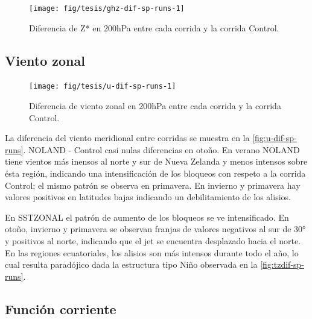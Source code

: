 \documentclass[spanish,a4paper,12pt,oneside]{book}
\begin{document}
\begin{landscape}\begin{figure}

{\centering \texttt{[image: fig/tesis/ghz-dif-sp-runs-1]} 

}

\caption{Diferencia de Z* en 200hPa entre cada corrida y la corrida Control.}\label{fig:ghz-dif-sp-runs}
\end{figure}
\end{landscape}

\subsection{Viento zonal}\label{viento-zonal-2}

\begin{landscape}\begin{figure}

{\centering \texttt{[image: fig/tesis/u-dif-sp-runs-1]} 

}

\caption{Diferencia de viento zonal en 200hPa entre cada corrida y la corrida Control.}\label{fig:u-dif-sp-runs}
\end{figure}
\end{landscape}

La diferencia del viento meridional entre corridas se muestra en la
\autoref{fig:u-dif-sp-runs}. NOLAND - Control casi nulas diferencias en
otoño. En verano NOLAND tiene vientos más inensos al norte y sur de
Nueva Zelanda y menos intensos sobre ésta región, indicando una
intensificación de los bloqueos con respeto a la corrida Control; el
mismo patrón se observa en primavera. En invierno y primavera hay
valores positivos en latitudes bajas indicando un debilitamiento de los
alisios.

En SSTZONAL el patrón de aumento de los bloqueos se ve intensificado. En
otoño, invierno y primavera se observan franjas de valores negativos al
sur de 30° y positivos al norte, indicando que el jet se encuentra
desplazado hacia el norte. En las regiones ecuatoriales, los alisios son
más intensos durante todo el año, lo cual resulta paradójico dada la
estructura tipo Niño observada en la \autoref{fig:tzdif-sp-runs}.

\subsection{Función corriente}\label{funcion-corriente-3}
\end{document}
